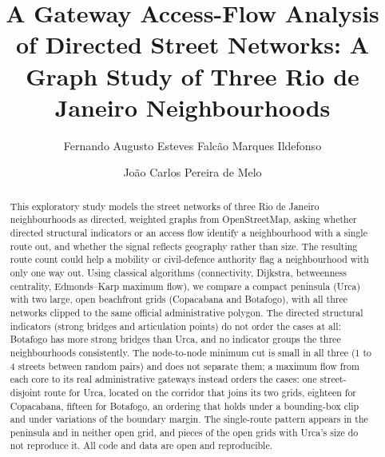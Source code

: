 \documentclass[runningheads]{llncs}
\begin{document}
\title{A Gateway Access-Flow Analysis of Directed Street Networks:
A Graph Study of Three Rio de Janeiro Neighbourhoods}


\author{Fernando Augusto Esteves Falcão Marques Ildefonso \and
João Carlos Pereira de Melo}



\maketitle

\begin{abstract}
This exploratory study models the street networks of three Rio de Janeiro
neighbourhoods as directed, weighted graphs from OpenStreetMap, asking
whether directed structural indicators or an access flow identify a
neighbourhood with a single route out, and whether the signal reflects
geography rather than size. The resulting route count could help a mobility or civil-defence
authority flag a neighbourhood with only one way out. Using classical
algorithms (connectivity, Dijkstra, betweenness
centrality, Edmonds--Karp maximum flow), we
compare a compact peninsula (Urca) with two large, open beachfront grids
(Copacabana and Botafogo), with all three networks clipped to the same
official administrative polygon. The directed structural indicators
(strong bridges and articulation points) do not order the cases at all:
Botafogo has more strong bridges than Urca, and no indicator groups the
three neighbourhoods consistently.
The node-to-node minimum cut is small in all three (1 to 4 streets between
random pairs) and does not separate them; a maximum flow from
each core to its real administrative gateways instead orders the cases:
one street-disjoint route for Urca, located on the corridor that joins its
two grids, eighteen for Copacabana, fifteen for Botafogo, an ordering that holds under a bounding-box clip and under
variations of the boundary margin. The
single-route pattern appears in the peninsula and in neither open grid, and
pieces of the open grids with Urca's size do not reproduce it. All code and data
are open and reproducible.

\end{abstract}
\end{document}
